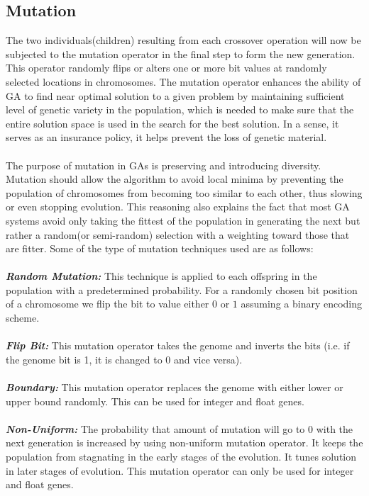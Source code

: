 \documentclass[a4paper, 12pt]{article}
\begin{document}
\subsection{Mutation}
The two individuals(children) resulting from each crossover operation will now be subjected to the mutation operator in the final step to form
the new generation. This operator randomly flips or alters one or more bit values at randomly selected locations in chromosomes. The mutation
operator enhances the ability of GA to find near optimal solution to a given problem by maintaining sufficient level of genetic variety in the 
population, which is needed to make sure that the entire solution space is used in the search for the best solution. In a sense, it serves as 
an insurance policy, it helps prevent the loss of genetic material.\\~\\
The purpose of mutation in GAs is preserving and introducing diversity. Mutation should allow the algorithm to avoid local minima by preventing
the population of chromosomes from becoming too similar to each other, thus slowing or even stopping evolution. This reasoning also explains 
the fact that most GA systems avoid only taking the fittest of the population in generating the next but rather a random(or semi-random) 
selection with a weighting toward those that are fitter. Some of the type of mutation techniques used are as follows:\\~\\
\textbf{\textit{Random Mutation: }}
This technique is applied to each offspring in the population with a predetermined probability. For a randomly chosen bit position of a 
chromosome we flip the bit to value either $0$ or $1$ assuming a binary encoding scheme.\\~\\
\textbf{\textit{Flip Bit: }}
This mutation operator takes the genome and inverts the bits (i.e. if the genome bit is 1, it is changed to $0$ and vice versa).\\~\\
\textbf{\textit{Boundary: }}
This mutation operator replaces the genome with either lower or upper bound randomly. This can be used for integer and float genes.\\~\\
\textbf{\textit{Non-Uniform: }}
The probability that amount of mutation will go to 0 with the next generation is increased by using non-uniform mutation operator. It keeps the population from stagnating in the early stages of the evolution. It tunes solution in later stages of evolution. This mutation operator can only be used for integer and float genes.\\~\\
\end{document}
